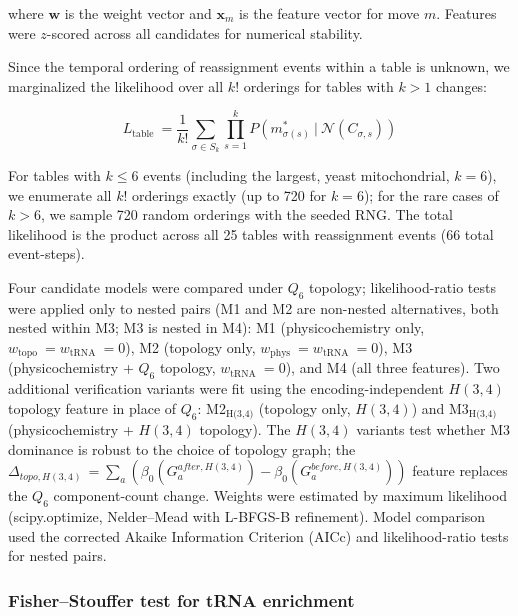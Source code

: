 \documentclass[preprint,11pt,authoryear,a4paper]{elsarticle}
\providecommand{\textsubscript}[1]{\ensuremath{_{\text{#1}}}}
\begin{document}
where \(\mathbf{w}\) is the weight vector and \(\mathbf{x}_{m}\) is the
feature vector for move \(m\). Features were \(z\)-scored across all
candidates for numerical stability.

Since the temporal ordering of reassignment events within a table is
unknown, we marginalized the likelihood over all \(k!\) orderings for
tables with \(k > 1\) changes:

\[L_{\text{table }} = \frac{1}{k!}\sum_{\sigma \in S_{k}}\prod_{s = 1}^{k}P\left( m_{\sigma(s)}^{\ast}~|~\mathcal{N}(C_{\sigma,s}) \right)\]
\protect{}\label{eq:orderavg}{}

For tables with \(k \leq 6\) events (including the largest, yeast
mitochondrial, \(k = 6\)), we enumerate all \(k!\) orderings exactly (up
to 720 for \(k = 6\)); for the rare cases of \(k > 6\), we sample 720
random orderings with the seeded RNG. The total likelihood is the
product across all 25 tables with reassignment events (66 total
event-steps).

Four candidate models were compared under \(Q_{6}\) topology;
likelihood-ratio tests were applied only to nested pairs (M1 and M2 are
non-nested alternatives, both nested within M3; M3 is nested in M4): M1
(physicochemistry only, \(w_{\text{topo }} = w_{\text{tRNA }} = 0\)), M2
(topology only, \(w_{\text{phys }} = w_{\text{tRNA }} = 0\)), M3
(physicochemistry + \(Q_{6}\) topology, \(w_{\text{tRNA }} = 0\)), and
M4 (all three features). Two additional verification variants were fit
using the encoding-independent \(H(3,4)\) topology feature in place of
\(Q_{6}\): M2\textsubscript{H(3,4)} (topology only, \(H(3,4)\)) and
M3\textsubscript{H(3,4)} (physicochemistry + \(H(3,4)\) topology). The
\(H(3,4)\) variants test whether M3 dominance is robust to the choice of
topology graph; the
\(\Delta_{topo,H(3,4)\ } = \sum_{a}\left( \beta_{0}\left( G_{a}^{after,H(3,4)} \right) - \beta_{0}\left( G_{a}^{before,H(3,4)} \right) \right)\)
feature replaces the \(Q_{6}\) component-count change. Weights were
estimated by maximum likelihood (scipy.optimize, Nelder--Mead with
L-BFGS-B refinement). Model comparison used the corrected Akaike
Information Criterion (AICc) and likelihood-ratio tests for nested
pairs.

\subsubsection{Fisher--Stouffer test for tRNA
enrichment}\label{sec:null-trna}
\end{document}
